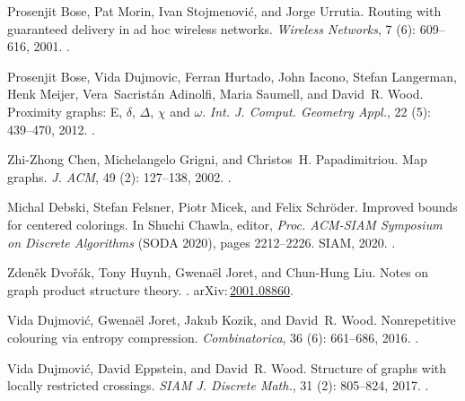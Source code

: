 \documentclass{patmorin}
\newcommand{\arXiv}[1]{arXiv:\,\href{https://arxiv.org/abs/#1}{#1}}
\begin{document}
\begin{thebibliography}{37}
	Prosenjit Bose, Pat Morin, Ivan Stojmenović, and Jorge Urrutia.
	\newblock Routing with guaranteed delivery in ad hoc wireless networks.
	\newblock \emph{Wireless Networks}, 7 (6): 609--616, 2001.
	\newblock {}.
	
	Prosenjit Bose, Vida Dujmovic, Ferran Hurtado, John Iacono, Stefan Langerman,
	Henk Meijer, Vera~Sacrist{\'{a}}n Adinolfi, Maria Saumell, and David~R. Wood.
	\newblock Proximity graphs: E, {\(\delta\)}, {\(\Delta\)}, {\(\chi\)} and
	{\(\omega\)}.
	\newblock \emph{Int. J. Comput. Geometry Appl.}, 22 (5):
	439--470, 2012.
	\newblock {}.
	
	Zhi-Zhong Chen, Michelangelo Grigni, and Christos~H. Papadimitriou.
	\newblock Map graphs.
	\newblock \emph{J. ACM}, 49 (2): 127--138, 2002.
	\newblock {}.
	
	Michal Debski, Stefan Felsner, Piotr Micek, and Felix Schr{\"{o}}der.
	\newblock Improved bounds for centered colorings.
	\newblock In Shuchi Chawla, editor, \emph{Proc. {ACM-SIAM} Symposium on
		Discrete Algorithms} ({SODA} 2020), pages 2212--2226. {SIAM}, 2020.
	\newblock {}.
	
	Zden{\v{e}}k Dvo{\v{r}}{\'a}k, Tony Huynh, Gwena\"el Joret, and Chun-Hung Liu.
	\newblock Notes on graph product structure theory.
	.
	\newblock \arXiv{2001.08860}.
	
	Vida Dujmovi\'{c}, Gwena\"{e}l Joret, Jakub Kozik, and David~R. Wood.
	\newblock Nonrepetitive colouring via entropy compression.
	\newblock \emph{Combinatorica}, 36 (6): 661--686, 2016.
	\newblock {}.
	
	Vida Dujmovi\'c, David Eppstein, and David~R. Wood.
	\newblock Structure of graphs with locally restricted crossings.
	\newblock \emph{{SIAM} J. Discrete Math.}, 31 (2): 805--824,
	2017{}.
	\newblock {}.
	

\end{thebibliography}
\end{document}
